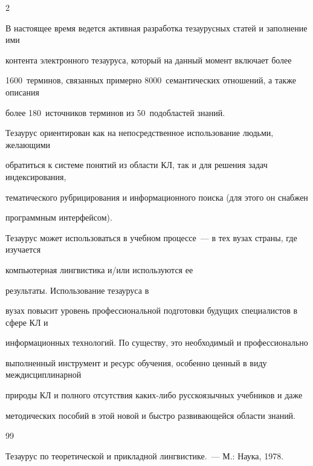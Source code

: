 \begin{multicols}{2}
  

  В настоящее время ведется активная разработка тезаурусных статей и заполнение ими 

контента электронного тезауруса, который на данный момент включает более 

1600~терминов, связанных примерно 8000~семантических отношений, а также описания 

более 180~источников терминов из 50~подобластей знаний. 

  

  Тезаурус ориентирован как на непосредственное использование людьми, желающими 

обратиться к системе понятий из области КЛ, так и для решения задач индексирования, 

тематического рубрицирования и информационного поиска (для этого он снабжен 

программным интерфейсом).

  

  Тезаурус может использоваться в учебном процессе~--- в тех вузах страны, где изучается 

компьютерная лингвистика и/или используются ее\linebreak

 результаты. Использование тезауруса в 

вузах повысит уровень профессиональной подготовки будущих специалистов в сфере КЛ и 

информационных технологий. По существу, это необходимый и профессионально 

выполненный инструмент и ресурс обучения, особенно ценный в виду междисциплинарной 

природы КЛ и полного отсутствия каких-либо русскоязычных учебников и даже 

методических пособий в этой новой и быстро развивающейся области знаний.





{\small\frenchspacing

{%


\begin{thebibliography}{99}

  



  Тезаурус по теоретической и прикладной лингвистике.~--- М.: Наука, 1978.


\end{thebibliography}}}
\end{multicols}
